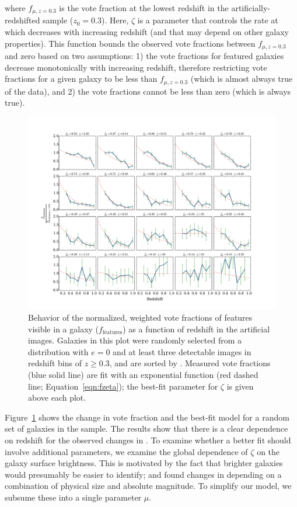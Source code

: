 \documentclass[twocolumn]{aastex6}
\begin{document}
\noindent where $f_{\mu,z=0.3}$ is the vote fraction at the lowest redshift in
the artificially-redshifted sample ($z_0=0.3$). Here, $\zeta$ is a parameter that
controls the rate at which \ffeatures{} decreases with increasing redshift (and
that may depend on other galaxy properties). This function bounds the observed
vote fractions between $f_{\mu,z=0.3}$ and zero based on two assumptions: 1)
the vote fractions for featured galaxies decrease monotonically with increasing
redshift, therefore restricting vote fractions for a given galaxy to be less
than $f_{\mu,z=0.3}$ (which is almost always true of the data), and 2) the
vote fractions cannot be less than zero (which is always true).

\begin{figure}
\center
\includegraphics[width=\textwidth]{figures/zeta_examples_sorted.pdf}
\caption{Behavior of the normalized, weighted vote fractions of features
visible in a galaxy ($f_\textrm{features}$) as a function of redshift in the
artificial \ferengi{} images. Galaxies in this plot were randomly selected from
a distribution with $e=0$ and at least three detectable images in redshift bins
of $z\ge0.3$, and are sorted by \ffeaturesrest. Measured vote fractions (blue
solid line) are fit with an exponential function (red dashed line;
Equation~\ref{eqn:fzeta}); the best-fit parameter for $\zeta$ is given above
each plot.}
\label{fig:zeta_examples}
\end{figure}

Figure~\ref{fig:zeta_examples} shows the change in vote fraction and the
best-fit model for a random set of galaxies in the \ferengi{} sample. The
results show that there is a clear dependence on redshift for the observed
changes in \ffeatures. To examine whether a better fit should involve
additional parameters, we examine the global dependence of $\zeta$ on the
galaxy surface brightness. This is motivated by the fact that brighter galaxies
would presumably be easier to identify; \citet{bam09} and \citet{wil13} found
changes in \ffeatures{} depending on a combination of physical size and
absolute magnitude. To simplify our model, we subsume these into a single
parameter $\mu$.
\end{document}
